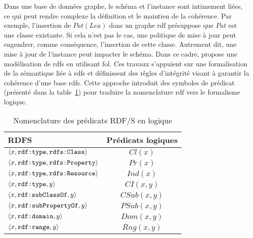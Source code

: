 Dans une base de données graphe, le schéma et l'instance sont intimement liées, ce qui peut rendre complexe la définition et le maintien de la cohérence.
Par exemple, l'insertion de $Pat(Lea)$ dans un graphe \gls{rdf} présuppose que $Pat$ est une classe existante.
Si cela n'est pas le cas, une politique de mise à jour peut engendrer, comme conséquence, l'insertion de cette classe.
Autrement dit, une mise à jour de l'instance peut impacter le schéma.
Dans ce cadre, \cite{flourisFormalFoundationsRDF2013} propose une modélisation de \gls{rdfs} en utilisant \gls{fol}.
Ces travaux s'appuient sur une formalisation de la sémantique liée à \gls{rdfs} et définissent des règles d'intégrité visant à garantir la cohérence d'une base \gls{rdfs}.
Cette approche introduit des symboles de prédicat (présenté dans la table~\ref{table:update:soa:rdfs}) pour traduire la nomenclature \gls{rdf} vers le formalisme logique.

\begin{table}[ht]
    \centering
    \begin{tabular}{|l|c|}
        \hline
        RDFS                                                       & Prédicats logiques \\
        \hline
        $\langle x, \verb|rdf:type|, \verb|rdfs:Class| \rangle$    & $Cl(x)$            \\
        $\langle x, \verb|rdf:type|, \verb|rdfs:Property| \rangle$ & $Pr(x)$            \\
        $\langle x, \verb|rdf:type|, \verb|rdfs:Resource| \rangle$ & $Ind(x)$           \\
        $\langle x, \verb|rdf:type|, y \rangle$                    & $CI(x, y)$         \\
        $\langle x, \verb|rdf:subClassOf|, y \rangle$              & $CSub(x, y)$       \\
        $\langle x, \verb|rdf:subPropertyOf|, y \rangle$           & $PSub(x, y)$       \\
        $\langle x, \verb|rdf:domain|, y \rangle$                  & $Dom(x, y)$        \\
        $\langle x, \verb|rdf:range|, y \rangle$                   & $Rng(x, y)$        \\
        \hline
    \end{tabular}
    \caption{Nomenclature des prédicats RDF/S en logique}
    \label{table:update:soa:rdfs}
\end{table}

